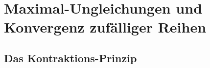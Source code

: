 \chapter{Maximal-Ungleichungen und Konvergenz zufälliger Reihen}




\section{Das Kontraktions-Prinzip}
